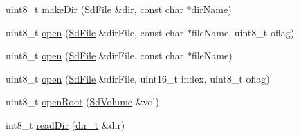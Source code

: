 \begin{DoxyCompactItemize}
\item 
uint8\+\_\+t \hyperlink{class_sd_file_af87e166d0059d392d7038f68fca68529}{make\+Dir} (\hyperlink{class_sd_file}{Sd\+File} \&dir, const char $\ast$\hyperlink{class_sd_file_ad7bbb106aa4c96c795c88b33def677bc}{dir\+Name})
\item 
uint8\+\_\+t \hyperlink{class_sd_file_afe1d8ce70ef58ee5967005047064167c}{open} (\hyperlink{class_sd_file}{Sd\+File} \&dir\+File, const char $\ast$file\+Name, uint8\+\_\+t oflag)
\item 
uint8\+\_\+t \hyperlink{class_sd_file_a71e1c08dc4fb58b95554925a25435721}{open} (\hyperlink{class_sd_file}{Sd\+File} \&dir\+File, const char $\ast$file\+Name)
\item 
uint8\+\_\+t \hyperlink{class_sd_file_a8bc20433f081a6e9f1546601b7a1d712}{open} (\hyperlink{class_sd_file}{Sd\+File} \&dir\+File, uint16\+\_\+t index, uint8\+\_\+t oflag)
\item 
uint8\+\_\+t \hyperlink{class_sd_file_abc60bbbb747c58319cfcfc11deb34d53}{open\+Root} (\hyperlink{class_sd_volume}{Sd\+Volume} \&vol)
\item 
int8\+\_\+t \hyperlink{class_sd_file_ad107b73c6edfa489b76366edfef2eeae}{read\+Dir} (\hyperlink{_fat_structs_8h_a803db59d4e16a0c54a647afc6a7954e3}{dir\+\_\+t} \&dir)
\end{DoxyCompactItemize}
